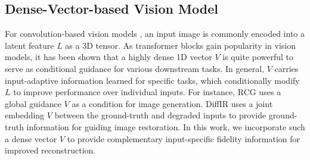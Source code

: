 \subsection{Dense-Vector-based Vision Model} For convolution-based vision models \cite{ gong2022reverse, cavigelli2017cas, li2023less}, an input image is commonly encoded into a latent feature $L$ as a 3D tensor. As transformer blocks gain popularity in vision models, it has been shown that a highly dense 1D vector $V$ is quite powerful to serve as conditional guidance for various downstream tasks. In general, $V$ carries input-adaptive information learned for specific tasks, which conditionally modify $L$ to improve performance over individual inputs. For instance, RCG \cite{RCG2023} uses a global guidance $V$ as a condition for image generation. DiffIR \cite{xia2023diffir} uses a joint embedding $V$ between the ground-truth and degraded inputs to provide ground-truth information for guiding image restoration. In this work, we incorporate such a dense vector $V$ to provide complementary input-specific fidelity information for improved reconstruction.
\vspace{-0.2em}